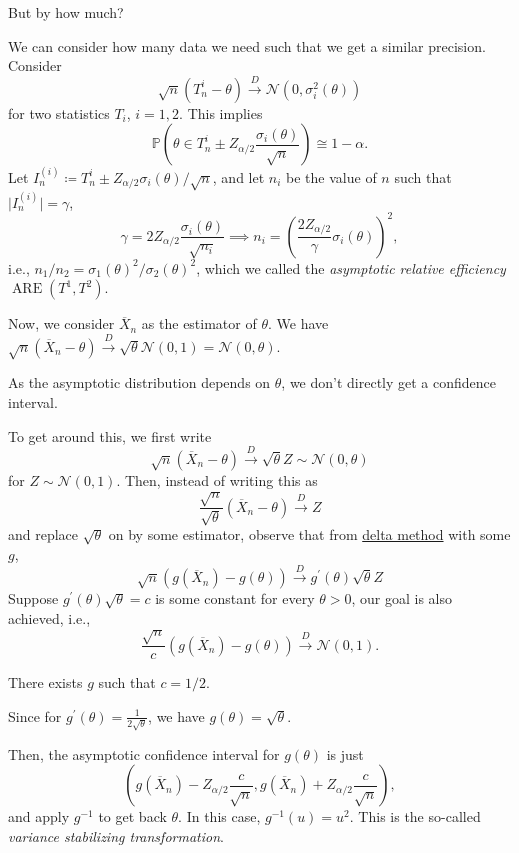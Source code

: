 \begin{problem*}
	But by how much?
\end{problem*}
\begin{answer}
	We can consider how many data we need such that we get a similar precision. Consider
	\[
		\sqrt{n} (T_n^i - \theta )
		\overset{D}{\to} \mathcal{N} (0, \sigma _i^2(\theta ))
	\]
	for two statistics \(T_i\), \(i = 1, 2\). This implies
	\[
		\mathbb{P} \left( \theta \in T_n^i \pm Z_{\alpha / 2} \frac{\sigma _i(\theta )}{\sqrt{n} } \right) \cong 1 - \alpha .
	\]
	Let \(I_n^{(i)} \coloneqq T_n^i \pm Z_{\alpha / 2} \sigma _i(\theta ) / \sqrt{n} \), and let \(n_i\) be the value of \(n\) such that \(\vert I_n^{(i)} \vert = \gamma \),
	\[
		\gamma = 2 Z_{\alpha / 2} \frac{\sigma _i(\theta )}{\sqrt{n_i} }
		\implies n_i = \left( \frac{2 Z_{\alpha / 2}}{\gamma } \sigma _i(\theta ) \right)^2 ,
	\]
	i.e., \(n_1 / n_2 = \sigma _1(\theta )^2 / \sigma _2(\theta )^2\), which we called the \emph{asymptotic relative efficiency} \(\operatorname{ARE}(T^1, T^2) \).
\end{answer}

Now, we consider \(\overline{X} _n\) as the estimator of \(\theta \). We have \(\sqrt{n} (\overline{X} _n - \theta ) \overset{D}{\to} \sqrt{\theta } \mathcal{N} (0, 1) = \mathcal{N} (0, \theta )\).

\begin{note}
	As the asymptotic distribution depends on \(\theta \), we don't directly get a confidence interval.
\end{note}

To get around this, we first write
\[
	\sqrt{n} (\overline{X} _n - \theta )
	\overset{D}{\to} \sqrt{\theta } Z \sim \mathcal{N} (0, \theta )
\]
for \(Z \sim \mathcal{N} (0, 1)\). Then, instead of writing this as
\[
	\frac{\sqrt{n} }{\sqrt{\theta } } (\overline{X} _n - \theta ) \overset{D}{\to} Z
\]
and replace \(\sqrt{\theta } \) on by some estimator, observe that from \hyperref[thm:delta-method]{delta method} with some \(g\),
\[
	\sqrt{n} (g(\overline{X} _n) - g(\theta )) \overset{D}{\to} g^{\prime} (\theta ) \sqrt{\theta } Z
\]
Suppose \(g^{\prime} (\theta ) \sqrt{\theta } = c \) is some constant for every \(\theta > 0\), our goal is also achieved, i.e.,
\[
	\frac{\sqrt{n}}{c} (g(\overline{X} _n) - g(\theta )) \overset{D}{\to} \mathcal{N} (0, 1).
\]

\begin{claim}
	There exists \(g\) such that \(c = 1 / 2\).
\end{claim}
\begin{explanation}
	Since for \(g^{\prime} (\theta ) = \frac{1}{2 \sqrt{\theta } }\), we have \(g(\theta ) = \sqrt{\theta } \).
\end{explanation}

Then, the asymptotic confidence interval for \(g(\theta )\) is just
\[
	\left( g(\overline{X} _n) - Z_{\alpha / 2} \frac{c}{\sqrt{n} } , g(\overline{X} _n) + Z_{\alpha / 2} \frac{c}{\sqrt{n} } \right),
\]
and apply \(g^{-1} \) to get back \(\theta \). In this case, \(g^{-1} (u) = u^2\). This is the so-called \emph{variance stabilizing transformation}.